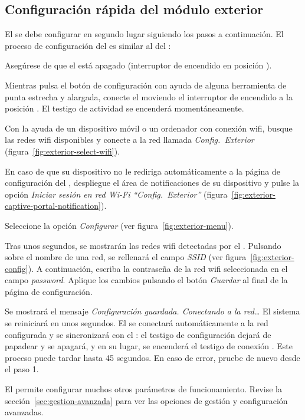 \subsection{Configuración rápida del módulo exterior}

El \MEE se debe configurar en segundo lugar siguiendo los pasos a continuación. El proceso de configuración del \MEE es similar al del \MIE:

\begin{enumeratecompact}

\item Asegúrese de que el \ME está apagado (interruptor de encendido  en posición \off).

\item Mientras pulsa el botón de configuración  con ayuda de alguna herramienta de punta estrecha y alargada, conecte el \ME moviendo el interruptor de encendido  a la posición \on. El testigo de actividad  se encenderá momentáneamente. 

\item Con la ayuda de un dispositivo móvil o un ordenador con conexión wifi, busque las redes wifi disponibles y conecte a la red llamada \emph{Config.~Exterior} (figura~\ref{fig:exterior-select-wifi}).

\item En caso de que su dispositivo no le rediriga automáticamente a la página de configuración del \ME, despliegue el área de notificaciones de su dispositivo y pulse la opción \emph{Iniciar sesión en red Wi-Fi ``Config.~Exterior''} (figura~\ref{fig:exterior-captive-portal-notification}).

\item Seleccione la opción \emph{Configurar} (ver figura~\ref{fig:exterior-menu}).

\item Tras unos segundos, se mostrarán las redes wifi detectadas por el \ME. Pulsando sobre el nombre de una red, se rellenará el campo \emph{SSID} (ver figura~\ref{fig:exterior-config}). A continuación, escriba la contraseña de la red wifi seleccionada en el campo \emph{password}. Aplique los cambios pulsando el botón \emph{Guardar} al final de la página de configuración.

\item Se mostrará el mensaje \emph{Configuración guardada. Conectando a la red\ldots} El sistema se reiniciará en unos segundos. El \ME se conectará automáticamente a la red configurada y se sincronizará con el \MI: el testigo de configuración  dejará de papadear y se apagará, y en su lugar, se encenderá el testigo de conexión . Este proceso puede tardar hasta 45 segundos. En caso de error, pruebe de nuevo desde el paso 1.

\end{enumeratecompact}



El \CMS permite configurar muchos otros parámetros de funcionamiento. Revise la sección~\ref{sec:gestion-avanzada} para ver las opciones de gestión y configuración avanzadas.
\tipend


